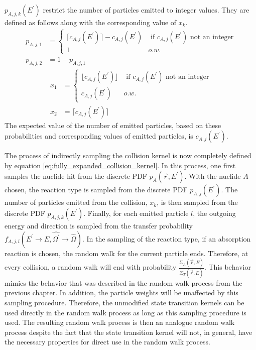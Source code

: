 $p_{A,j,k}(E^{'})$ restrict the number of particles emitted to integer values.
They are defined as follows along with the corresponding value of $x_k$.
\begin{align}
  p_{A,j,1} & =
  \begin{cases}
    \lceil c_{A,j}(E^{'}) \rceil - c_{A,j}(E^{'}) & \text{ if } c_{A,j}(E^{'})
    \text{ not an integer} \\
    1 & o.w.
  \end{cases} \\
  p_{A,j,2} & = 1 - p_{A,j,1}
\end{align}
\begin{align}
  x_1 & = 
  \begin{cases}
    \lfloor c_{A,j}(E^{'}) \rfloor & \text{ if } c_{A,j}(E^{'})
    \text{ not an integer} \\
    c_{A,j}(E^{'}) & o.w.
  \end{cases} \\
  x_2 & = \lceil c_{A,j}(E^{'}) \rceil
\end{align}
The expected value of the number of emitted particles, based on these probabilities and corresponding values of emitted particles, is $c_{A,j}(E^{'})$.

The process of indirectly sampling the collision kernel is now completely
defined by equation \ref{eq:fully_expanded_collision_kernel}. In this process,
one first samples the nuclide hit from the discrete PDF $p_A(\vec{r},E^{'})$.
With the nuclide $A$ chosen, the reaction type is sampled from the discrete
PDF $p_{A,j}(E^{'})$. The number of particles emitted from the collision, $x_k$, 
is then sampled from the discrete PDF $p_{A,j,k}(E^{'})$. Finally, for each 
emitted particle $l$, the outgoing energy and direction is sampled from the
transfer probability $f_{A,j,l}(E^{'} \to E,\hat{\Omega^{'}} \to \hat{\Omega})$.
In the sampling of the reaction type, if an absorption reaction is chosen,
the random walk for the current particle ends. Therefore, at every collision,
a random walk will end with probability 
$\frac{\Sigma_A(\vec{r},E)}{\Sigma_T(\vec{r},E)}$. This behavior 
mimics the behavior that was described in the random walk process from the
previous chapter. In addition, the particle weights will be unaffected by this
sampling procedure. Therefore, the unmodified state transition kernels can
be used directly in the random walk process as long as this sampling procedure
is used. The resulting random walk process is then an analogue random walk
process despite the fact that the state transition kernel will not, in general, 
have the necessary properties for direct use in the random walk process. 

